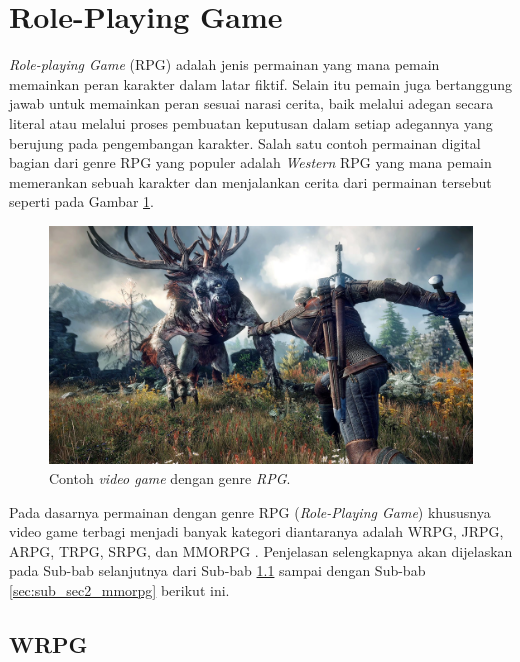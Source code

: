 \section{Role-Playing Game}
\label{sec:sec2_rpg}
\vspace{1ex}

\textit{Role-playing Game} (RPG) \citep{Panumate2015} adalah jenis permainan yang mana pemain memainkan peran karakter dalam latar fiktif. Selain itu pemain juga bertanggung jawab untuk memainkan peran sesuai narasi cerita, baik melalui adegan secara literal atau melalui proses pembuatan keputusan dalam setiap adegannya yang berujung pada pengembangan karakter. Salah satu contoh permainan digital bagian dari genre RPG yang populer adalah \textit{Western} RPG yang mana pemain memerankan sebuah karakter dan menjalankan cerita dari permainan tersebut seperti pada Gambar \ref{fig:action_rpg}.
\vspace{1ex}

\begin{figure} [!h] \centering
	\includegraphics[scale=0.16]{img/whitcher.jpg}
	\caption{Contoh \textit{video game} dengan genre \textit{RPG}.}
	\label{fig:action_rpg}
\end{figure}

Pada dasarnya permainan dengan genre RPG (\textit{Role-Playing Game}) khususnya video game terbagi menjadi banyak kategori diantaranya adalah WRPG, JRPG, ARPG, TRPG, SRPG, dan MMORPG \citep{stenstrom2012}. Penjelasan selengkapnya akan dijelaskan pada Sub-bab selanjutnya dari Sub-bab \ref{sec:sub_sec2_wrpg} sampai dengan Sub-bab \ref{sec:sub_sec2_mmorpg} berikut ini.
\vspace{1ex}

\subsection{WRPG}
\label{sec:sub_sec2_wrpg}

